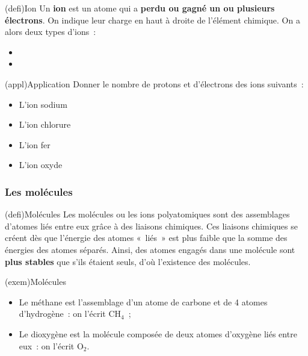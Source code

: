 \documentclass[../../main/main.tex]{subfiles}
\begin{document}
\begin{tcb}[label=def:ion](defi){Ion}
	Un \textbf{ion} est un atome qui a \textbf{perdu ou gagné un ou plusieurs
		électrons}. On indique leur charge en haut à droite de l'élément chimique.
	On a alors deux types d'ions~:
	\begin{itemize}
		\item {}
		\item {}
	\end{itemize}
\end{tcb}
\begin{tcb}[label=exem:ion](appl){Application}
	Donner le nombre de protons et d'électrons des ions suivants~:
	\smallbreak
	\begin{isd}
		\begin{itemize}
			\item L'ion sodium 
			      \smallbreak
			\item L'ion chlorure 
			      \smallbreak
		\end{itemize}
		\tcblower
		\begin{itemize}
			\item L'ion fer 
			      \smallbreak
			\item L'ion oxyde 
			      \smallbreak
		\end{itemize}
	\end{isd}
\end{tcb}

\subsubsection{Les molécules}
\begin{tcb}[label=def:molécules](defi){Molécules}
	Les molécules ou les ions polyatomiques sont des assemblages d'atomes
	liés entre eux grâce à des liaisons chimiques. Ces liaisons chimiques se
	créent dès que l'énergie des atomes «~liés~» est plus faible que la
	somme des énergies des atomes séparés.
	\smallbreak
	Ainsi, des atomes engagés dans une molécule sont \textbf{plus stables} que
	s'ils étaient seuls, d'où l'existence des molécules.
\end{tcb}
\begin{tcb}[label=exem:molécules](exem){Molécules}
	\begin{itemize}
		\item Le méthane est l'assemblage d'un atome de carbone et de 4
		      atomes d'hydrogène~: on l'écrit CH$_4$~;
		\item Le dioxygène est la molécule composée de deux atomes d'oxygène
		      liés entre eux~: on l'écrit O$_2$.
	\end{itemize}
\end{tcb}
\end{document}

